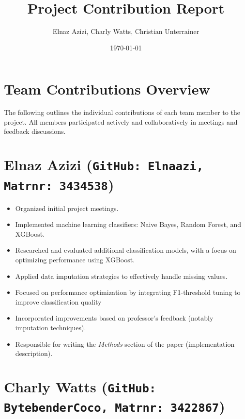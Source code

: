 \documentclass[11pt,a4paper]{article}
\title{\textbf{Project Contribution Report}}
\author{Elnaz Azizi, Charly Watts, Christian Unterrainer}
\date{\today}
\begin{document}
\maketitle

\section*{Team Contributions Overview}

The following outlines the individual contributions of each team member to the project. All members participated actively and collaboratively in meetings and feedback discussions.

\section*{Elnaz Azizi (\texttt{GitHub: Elnaazi, Matrnr: 3434538})}

\begin{itemize}[leftmargin=1.5em]
    \item Organized initial project meetings.
    \item Implemented machine learning classifiers: Naive Bayes, Random Forest, and XGBoost.
    \item Researched and evaluated additional classification models, with a focus on optimizing performance using XGBoost.
    \item Applied data imputation strategies to effectively handle missing values.
    \item Focused on performance optimization by integrating F1-threshold tuning to improve classification quality
    \item Incorporated improvements based on professor's feedback (notably imputation techniques).
    \item Responsible for writing the \textit{Methods} section of the paper (implementation description).
\end{itemize}

\section*{Charly Watts (\texttt{GitHub: BytebenderCoco, Matrnr: 3422867})}
\end{document}
